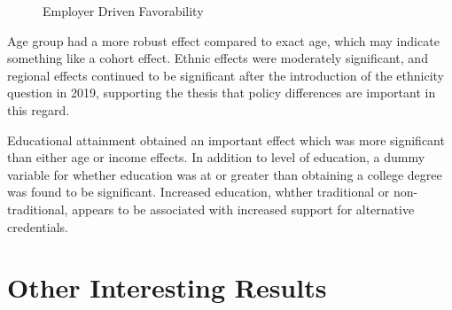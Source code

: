 \documentclass[AER]{./aea-latex-templates/AEA}
\begin{document}
        \begin{figure}[h!]
            \centering
            \caption{Employer Driven Favorability}
        
        
            \label{fig:employer_driven_favorability}
            \end{figure}
        
        Age group had a more robust effect compared to exact age, which may
        indicate something like a cohort effect. Ethnic effects were moderately
        significant, and regional effects continued to be significant after the
        introduction of the ethnicity question in 2019, supporting the thesis
        that policy differences are important in this regard.
        
        Educational attainment obtained an important effect which was more
        significant than either age or income effects. In addition to level of
        education, a dummy variable for whether education was at or greater than
        obtaining a college degree was found to be significant. Increased
        education, whther traditional or non-traditional, appears to be
        associated with increased support for alternative credentials.
        
        \section{Other Interesting Results}
        
\end{document}
